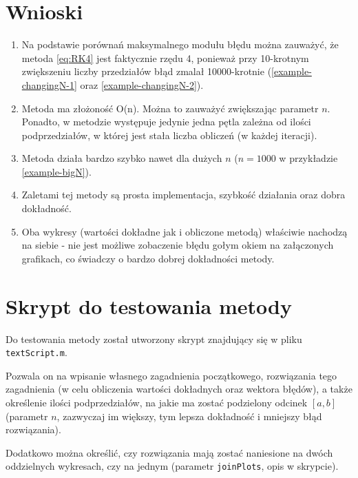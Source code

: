 \documentclass[12pt]{article}
\begin{document}
	
	\section{Wnioski}
	\begin{enumerate}
		\item
		Na podstawie porównań maksymalnego modułu błędu można zauważyć, że metoda \eqref{eq:RK4} jest faktycznie rzędu 4, ponieważ przy 10-krotnym zwiększeniu liczby przedziałów błąd zmalał 10000-krotnie (\ref{example-changingN-1} oraz \ref{example-changingN-2}).
		
		\item
		Metoda ma złożoność O(n). Można to zauważyć zwiększając parametr $n$. Ponadto, w metodzie występuje jedynie jedna pętla zależna od ilości podprzedziałów, w której jest stała liczba obliczeń (w każdej iteracji).
		
		\item
		Metoda działa bardzo szybko nawet dla dużych $n$ ($n = 1000$ w przykładzie \ref{example-bigN}).
		
		\item
		Zaletami tej metody są prosta implementacja, szybkość działania oraz dobra dokładność.
		
		\item
		Oba wykresy (wartości dokładne jak i obliczone metodą) właściwie nachodzą na siebie - nie jest możliwe zobaczenie błędu gołym okiem na załączonych grafikach, co świadczy o bardzo dobrej dokładności metody.
	\end{enumerate}
	
	
	
	\section{Skrypt do testowania metody}
	\label{sec:testing-script}
	Do testowania metody został utworzony skrypt znajdujący się w pliku \texttt{textScript.m}.
	
	Pozwala on na wpisanie własnego zagadnienia początkowego, rozwiązania tego zagadnienia (w celu obliczenia wartości dokładnych oraz wektora błędów), a także określenie ilości podprzedziałów, na jakie ma zostać podzielony odcinek $[a, b]$ (parametr $n$, zazwyczaj im większy, tym lepsza dokładność i mniejszy błąd rozwiązania).
	
	Dodatkowo można określić, czy rozwiązania mają zostać naniesione na dwóch oddzielnych wykresach, czy na jednym (parametr \texttt{joinPlots}, opis w skrypcie).
	
	
\end{document}
